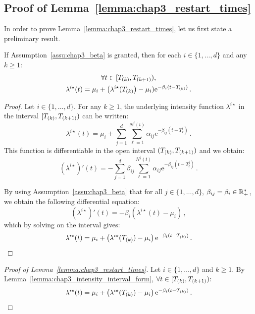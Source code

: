 \begin{subappendices}
    \section{Proof of Lemma~\ref{lemma:chap3_restart_times}} \label{app:chap3_proof_lemma}
    In order to prove Lemma~\ref{lemma:chap3_restart_times}, let us first state a preliminary result.
    
    \begin{lemma}\label{lemma:chap3_intensity_interval_form}
        If Assumption~\ref{assu:chap3_beta} is granted, then for each $i\in\{1,\ldots, d\}$ and any $k\geq 1$:
        \begin{gather*}
            \forall t \in [T\park, T\park[k+1]),
            \\
            \lambda^{i\star}(t) = \mu_i + \left(\lambda^{i\star}(T\park\right) - \mu_i)\mathrm{e}^{-\beta_i(t-T\park)}\,.
        \end{gather*}
      \end{lemma}
  
      \begin{proof}
        Let $i\in\{1,\ldots, d\}$. For any $k\geq 1$, the underlying intensity function $\lambda^{i\star}$ in the interval $[T\park, T\park[k+1])$ can be written:
        \[\lambda^{i\star}(t) = \mu_i + \sum_{j=1}^{d}{\sum_{\ell=1}^{N^j(t)}{\alpha_{ij}\mathrm{e}^{-\beta_{ij}(t-T_\ell^j)}}}\,.\]
        This function is differentiable in the open interval $(T\park, T\park[k+1])$ and we obtain:
        \[(\lambda^{i\star})'(t) = -\sum_{j=1}^{d}{\beta_{ij}\sum_{\ell=1}^{N^j(t)}{\alpha_{ij}\mathrm{e}^{-\beta_{ij}(t-T_\ell^j)}}}\,.\]
  
        By using Assumption~\ref{assu:chap3_beta} that for all $j\in\{1,\ldots, d\}$, $\beta_{ij} = \beta_i\in\RR_+^*$, we obtain the following differential equation:
        \[(\lambda^{i\star})'(t) = -\beta_i\left(\lambda^{i\star}(t) - \mu_i\right)\,,\] which by solving on the interval gives:
        \begin{equation*}
            \lambda^{i\star}(t) = \mu_i + \left(\lambda^{i\star}(T\park) - \mu_i\right)\mathrm{e}^{-\beta_i(t-T\park)}\,.
        \end{equation*}
      \end{proof}
      
      \begin{proof}[Proof of Lemma~\ref{lemma:chap3_restart_times}]
        Let $i\in\{1,\ldots, d\}$ and $k\geq 1$.
        By Lemma~\ref{lemma:chap3_intensity_interval_form}, $\forall t \in [T\park, T\park[k+1])$:
        \begin{equation*}
            \lambda^{i\star}(t) = \mu_i + \left(\lambda^{i\star}(T\park) - \mu_i\right)\mathrm{e}^{-\beta_i(t-T\park)}\,.
        \end{equation*}
  

\end{proof}
\end{subappendices}
